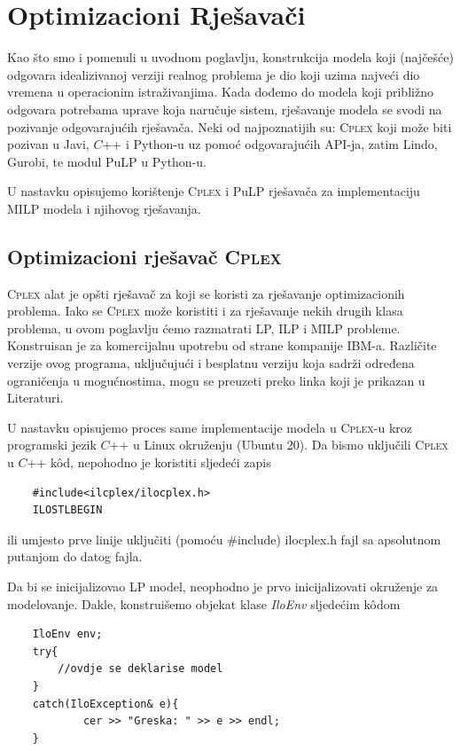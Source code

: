 \documentclass[a4paper, utf8, 11pt, colorlinks]{book}
\theoremstyle{definition}
\begin{document}
 \chapter{Optimizacioni Rješavači}
 
 Kao što smo i pomenuli u uvodnom poglavlju, konstrukcija modela koji (najčešće) odgovara idealizivanoj verziji realnog problema je 
 dio koji uzima najveći dio vremena u operacionim istraživanjima. Kada dođemo do modela koji približno odgovara potrebama uprave koja naručuje sistem, rješavanje modela se svodi na pozivanje odgovarajućih rješavača. Neki od najpoznatijih su: 
 \textsc{Cplex} koji može biti pozivan u Javi, $C$++ i Python-u uz pomoć odgovarajućih API-ja, zatim Lindo, Gurobi, te modul PuLP u Python-u.
 
 U nastavku opisujemo korištenje \textsc{Cplex} i PuLP rješavača za implementaciju MILP modela i njihovog rješavanja. 
 
 \section{Optimizacioni rješavač \textsc{Cplex}}
 \textsc{Cplex} alat je opšti rješavač za koji se koristi za rješavanje optimizacionih problema. Iako se \textsc{Cplex} može koristiti i za rješavanje nekih drugih klasa problema, u ovom poglavlju ćemo razmatrati  LP, ILP i MILP probleme. Konstruisan je za komercijalnu upotrebu od strane kompanije IBM-a. Različite verzije ovog programa, uključujući i besplatnu verziju koja sadrži određena ograničenja u mogućnostima, mogu se preuzeti preko linka koji je prikazan u Literaturi.
 
 
 U nastavku opisujemo proces same implementacije modela u \textsc{Cplex}-u kroz programski jezik $C$++ u Linux okruženju (Ubuntu 20).
 Da bismo uključili \textsc{Cplex} u $C$++ k\^od, nepohodno je koristiti sljedeći zapis
 \begin{verbatim}
 	#include<ilcplex/ilocplex.h>
 	ILOSTLBEGIN
 \end{verbatim}
ili umjesto prve linije uključiti (pomoću \#include) ilocplex.h fajl sa apsolutnom putanjom do datog fajla. 

 Da bi se inicijalizovao LP model, neophodno je prvo inicijalizovati okruženje za modelovanje. Dakle, konstruišemo objekat klase \emph{IloEnv} sljedećim k\^odom
 \begin{verbatim}
 	IloEnv env;
 	try{
 		//ovdje se deklarise model
 	}
 	catch(IloException& e){
 		    cer >> "Greska: " >> e >> endl;
 	}
 \end{verbatim}
 
\end{document}
